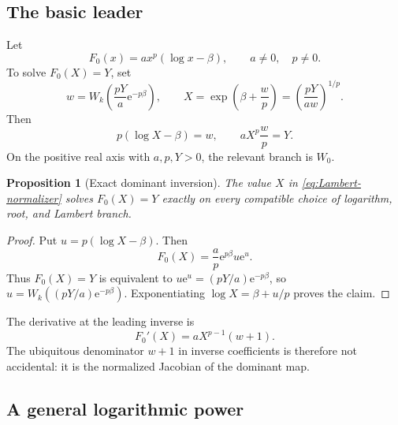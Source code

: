 \documentclass[11pt,a4paper]{article}
\numberwithin{equation}{section}
\newtheorem{proposition}[theorem]{Proposition}
\theoremstyle{definition}
\theoremstyle{remark}
\newcommand{\e}{\mathrm e}
\begin{document}
\subsection{The basic leader}

Let
\begin{equation}
 F_0(x)=a x^p(\log x-\beta),
 \qquad a\neq0,\quad p\neq0.
 \label{eq:F0-basic}
\end{equation}
To solve \(F_0(X)=Y\), set
\begin{equation}
 w=W_k\!\left(\frac{pY}{a}\e^{-p\beta}\right),
 \qquad
 X=\exp\!\left(\beta+\frac{w}{p}\right)
 =\left(\frac{pY}{aw}\right)^{1/p}.
 \label{eq:Lambert-normalizer}
\end{equation}
Then
\begin{equation}
 p(\log X-\beta)=w,
 \qquad
 aX^p\frac{w}{p}=Y.
 \label{eq:Lambert-identities}
\end{equation}
On the positive real axis with \(a,p,Y>0\), the relevant branch is
\(W_0\).

\begin{proposition}[Exact dominant inversion]\label{prop:dominant-inversion}
The value \(X\) in \cref{eq:Lambert-normalizer} solves
\(F_0(X)=Y\) exactly on every compatible choice of logarithm, root, and
Lambert branch.
\end{proposition}

\begin{proof}
Put \(u=p(\log X-\beta)\).  Then
\[
 F_0(X)=\frac{a}{p}\e^{p\beta}u\e^u.
\]
Thus \(F_0(X)=Y\) is equivalent to
\(u\e^u=(pY/a)\e^{-p\beta}\), so \(u=W_k((pY/a)\e^{-p\beta})\).
Exponentiating \(\log X=\beta+u/p\) proves the claim.
\end{proof}

The derivative at the leading inverse is
\begin{equation}
 F_0'(X)=aX^{p-1}(w+1).
 \label{eq:F0prime}
\end{equation}
The ubiquitous denominator \(w+1\) in inverse coefficients is therefore
not accidental: it is the normalized Jacobian of the dominant map.

\subsection{A general logarithmic power}
\end{document}
